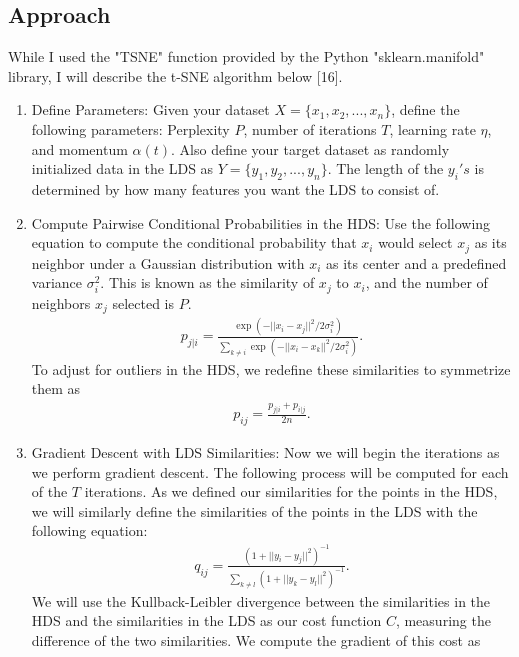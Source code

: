 \documentclass[11pt]{article}
\begin{document}
\subsection{Approach}
\hspace{5mm}While I used the "TSNE" function provided by the Python "sklearn.manifold" library, I will describe the t-SNE algorithm below [16].
\begin{enumerate}
    \item Define Parameters:\newline
    Given your dataset $X = \{x_1, x_2, ..., x_n\}$, define the following parameters: Perplexity $P$, number of iterations $T$, learning rate $\eta$, and momentum $\alpha(t)$. Also define your target dataset as randomly initialized data in the LDS as $Y = \{y_1, y_2, ..., y_n\}$. The length of the $y_i's$ is determined by how many features you want the LDS to consist of.
    \item Compute Pairwise Conditional Probabilities in the HDS:\newline
    Use the following equation to compute the conditional probability that $x_i$ would select $x_j$ as its neighbor under a Gaussian distribution with $x_i$ as its center and a predefined variance $\sigma^2_i$. This is known as the similarity of $x_j$ to $x_i$, and the number of neighbors $x_j$ selected is $P$.
    \begin{align}
        p_{j|i} = \frac{\exp(-||x_i - x_j||^2/2\sigma_i^2)}{\sum_{k\not=i}\exp(-||x_i - x_k||^2/2\sigma_i^2)}.
    \end{align}
    To adjust for outliers in the HDS, we redefine these similarities to symmetrize them as
    \begin{align*}
        p_{ij} = \frac{p_{j|i} + p_{i|j}}{2n}.
    \end{align*}
    \item Gradient Descent with LDS Similarities:\newline
    Now we will begin the iterations as we perform gradient descent. The following process will be computed for each of the $T$ iterations. As we defined our similarities for the points in the HDS, we will similarly define the similarities of the points in the LDS with the following equation:
    \begin{align}
        q_{ij} = \frac{(1 + ||y_i - y_j||^2)^{-1}}{\sum_{k\not=l} (1 + ||y_k - y_l||^2)^{-1}}.
    \end{align}
    We will use the Kullback-Leibler divergence between the similarities in the HDS and the similarities in the LDS as our cost function $C$, measuring the difference of the two similarities. We compute the gradient of this cost as

\end{enumerate}
\end{document}
